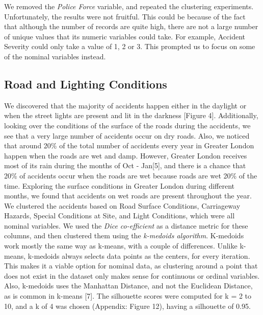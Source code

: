 \documentclass{neu_handout}
\begin{document}
We removed the \textit{Police Force} variable, and repeated the clustering experiments. Unfortunately, the results were not fruitful. This could be because of the fact that although the number of records are quite high, there are not a large number of unique values that its numeric variables could take. For example, Accident Severity could only take a value of 1, 2 or 3. This prompted us to focus on some of the nominal variables instead. \\

\subsection{Road and Lighting Conditions}

We discovered that the majority of accidents happen either in the daylight or when the street lights are present and lit in the darkness [Figure 4]. Additionally, looking over the conditions of the surface of the roads during the accidents, we see that a very large number of accidents occur on dry roads. Also, we noticed that around 20\% of the total number of accidents every year in Greater London happen when the roads are wet and damp. However, Greater London receives most of its rain during the months of Oct - Jan[5], and there is a chance that 20\% of accidents occur when the roads are wet because roads are wet 20\% of the time. Exploring the surface conditions in Greater London during different months, we found that accidents on wet roads are present throughout the year.\\

We clustered the accidents based on Road Surface Conditions, Carriageway Hazards, Special Conditions at Site, and Light Conditions, which were all nominal variables. We used the \textit{Dice co-efficient} as a distance metric for these columns, and then clustered them using the \textit{k-medoids algorithm}. K-medoids work mostly the same way as k-means, with a couple of differences. Unlike k-means, k-medoids always selects data points as the centers, for every iteration. This makes it a viable option for nominal data, as clustering around a point that does not exist in the dataset only makes sense for continuous or ordinal variables. Also, k-medoids uses the Manhattan Distance, and not the Euclidean Distance, as is common in k-means [7]. The silhouette scores were computed for k = 2 to 10, and a k of 4 was chosen (Appendix: Figure 12), having a silhouette of 0.95. \\
\end{document}
